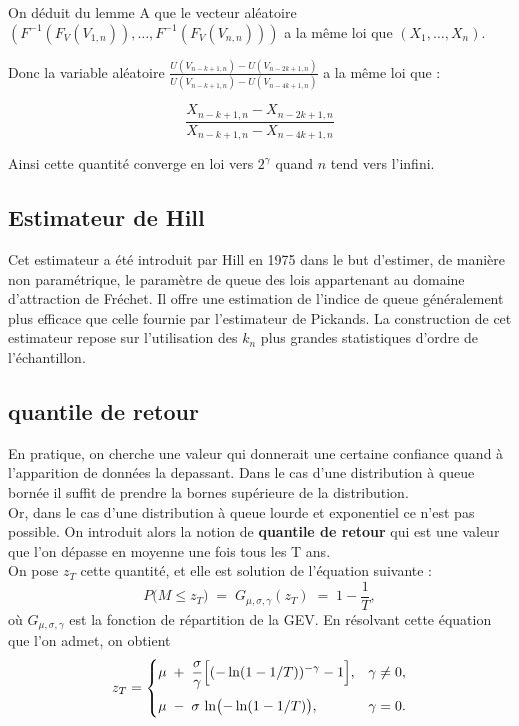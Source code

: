\documentclass{article}
\theoremstyle{plain}
\theoremstyle{definition}
\theoremstyle{plain}
\begin{document}
On déduit du lemme A que le vecteur aléatoire $(F^{-1}(F_V(V_{1,n})),\dots, F^{-1}(F_V(V_{n,n})))$ a la même loi que $(X_1,\dots,X_n)$. 

Donc la variable aléatoire \(\frac{U(V_{n-k+1,n}) - U(V_{n-2k+1,n})}{U(V_{n-k+1,n}) - U(V_{n-4k+1,n})}\) a la même loi que :

\[
\frac{X_{n-k+1,n} - X_{n-2k+1,n}}{X_{n-k+1,n} - X_{n-4k+1,n}}
\]

Ainsi cette quantité converge en loi vers $2^{\gamma}$ quand $n$ tend vers l’infini.

\subsection{Estimateur de Hill}
Cet estimateur a été introduit par Hill en 1975 dans le but d’estimer, de manière non paramétrique, le paramètre de queue des lois appartenant au domaine d’attraction de Fréchet. Il offre une estimation de l’indice de queue généralement plus efficace que celle fournie par l’estimateur de Pickands. La construction de cet estimateur repose sur l’utilisation des $k_n$ plus grandes statistiques d’ordre de l’échantillon.


\subsection{quantile de retour}

En pratique, on cherche une valeur qui donnerait une certaine confiance quand à l'apparition
de données la depassant. Dans le cas d'une distribution à queue bornée il suffit de prendre la bornes supérieure de la distribution.
\\
Or, dans le cas d'une distribution à queue lourde et exponentiel ce n'est pas possible. On introduit alors la notion de \textbf{quantile de retour} qui est une valeur que l'on dépasse en moyenne une fois tous les T ans.
\\
On pose $z_T$ cette quantité, et elle est solution de l'équation suivante :
\[
P\bigl(M \le z_T\bigr)
\;=\;
G_{\mu,\sigma,\gamma}(z_T)
\;=\;
1 - \frac{1}{T},
\]
où \(G_{\mu,\sigma,\gamma}\) est la fonction de répartition de la GEV. En résolvant cette équation que l'on admet, on obtient
\[
z_T =
\begin{cases}
\displaystyle
\mu \;+\;\frac{\sigma}{\gamma}\Bigl[(-\ln(1 - 1/T))^{-\gamma} - 1\Bigr],
&\gamma \neq 0,\\[1em]
\displaystyle
\mu \;-\;\sigma\,\ln\bigl(-\ln(1 - 1/T)\bigr),
&\gamma = 0.
\end{cases}
\]
\end{document}
